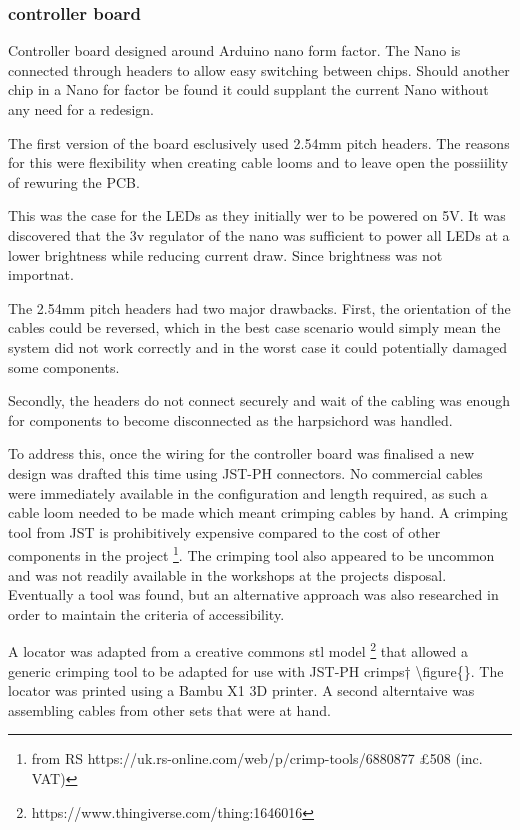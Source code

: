 \subsubsection{controller board}\label{controller-board}

Controller board designed around Arduino nano form factor. The Nano is
connected through headers to allow easy switching between chips. Should
another chip in a Nano for factor be found it could supplant the current
Nano without any need for a redesign.

The first version of the board esclusively used 2.54mm pitch headers.
The reasons for this were flexibility when creating cable looms and to
leave open the possiility of rewuring the PCB.

This was the case for the LEDs as they initially wer to be powered on
5V. It was discovered that the 3v regulator of the nano was sufficient
to power all LEDs at a lower brightness while reducing current draw.
Since brightness was not importnat.

The 2.54mm pitch headers had two major drawbacks. First, the orientation
of the cables could be reversed, which in the best case scenario would
simply mean the system did not work correctly and in the worst case it
could potentially damaged some components.

Secondly, the headers do not connect securely and wait of the cabling
was enough for components to become disconnected as the harpsichord was
handled.

To address this, once the wiring for the controller board was finalised
a new design was drafted this time using JST-PH connectors. No
commercial cables were immediately available in the configuration and
length required, as such a cable loom needed to be made which meant
crimping cables by hand. A crimping tool from JST is prohibitively
expensive compared to the cost of other components in the project
\footnote{from RS https://uk.rs-online.com/web/p/crimp-tools/6880877
£508 (inc. VAT)}. The crimping tool also appeared to be uncommon and was
not readily available in the workshops at the projects disposal.
Eventually a tool was found, but an alternative approach was also
researched in order to maintain the criteria of accessibility.

A locator was adapted from a creative commons stl model
\footnote{https://www.thingiverse.com/thing:1646016} that allowed a
generic crimping tool to be adapted for use with JST-PH crimps†
\textbackslash figure\{\}. The locator was printed using a Bambu X1 3D
printer. A second alterntaive was assembling cables from other sets that
were at hand.

